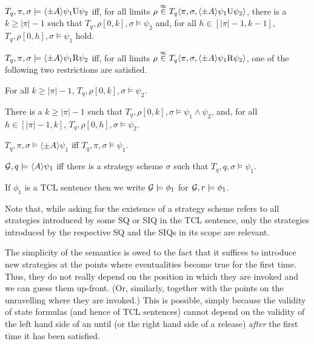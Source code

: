 \begin{list1}
\item $T_q,\pi,\sigma \models \langle \pm A \rangle \psi_1\textrm{U}\psi_2$ iff, for all limits 
    $\rho\stackrel{\infty}\in T_q\langle \pi,\sigma, \langle \pm A \rangle\psi_1\textrm{U}\psi_2\rangle$, 
    there is a $k \geq |\pi|-1$ 
    such that $T_q,\rho[0,k],\sigma \models \psi_2$ and, 
    for all $h\in [|\pi|-1,k-1]$, 
    $T_q,\rho[0,h],\sigma\models \psi_1$ hold. 
\item $T_q,\pi,\sigma \models \langle \pm A \rangle \psi_1\textrm{R}\psi_2$ iff, 
    for all limits 
    $\rho\stackrel{\infty}\in T_q\langle\pi,\sigma,\langle \pm A \rangle\psi_1\textrm{R}\psi_2\rangle$, one of the following two restrictions 
    are satisfied. 
    \begin{list2} 
    \item For all $k \geq |\pi|-1$, $T_q,\rho[0,k],\sigma \models \psi_2$. 
    \item There is a $k\geq |\pi|-1$ such that 
      $T_q,\rho[0,k],\sigma\models \psi_1\wedge\psi_2$, and, 
      for all $h\in [|\pi|-1,k]$, $T_q,\rho[0,h],\sigma\models \psi_2$.
    \end{list2} 
\item $T_q,\pi,\sigma\models \langle \pm A \rangle \psi_1$ iff
    $T_q,\pi,\sigma \models \psi_1$.
\item ${\cal G}, q \models \langle A \rangle \psi_1$ iff there is a strategy scheme $\sigma$ such that
    $T_q,q,\sigma \models \psi_1$.
\end{list1}

If $\phi_1$ is a TCL sentence %
then we write ${\cal G}\models\phi_1$ for ${\cal G},r\models\phi_1$.


Note that, while asking for the existence of a strategy scheme refers to all strategies introduced by some SQ or SIQ in the TCL sentence, only the strategies introduced by the respective SQ and the SIQs in its scope are relevant.

The simplicity of the semantics is owed to the fact that 
it suffices to introduce new strategies at the points 
where eventualities become true for the first time.
Thus, they do not really depend on the position 
in which they are invoked and we can guess them up-front. 
(Or, similarly, together with the points on the unravelling 
where they are invoked.)
%
This is possible, simply because the validity of state formulas (and hence of TCL sentences) cannot depend on the validity of the left hand side of an until (or the right hand side of a release) \emph{after} the first time it has been satisfied. 


